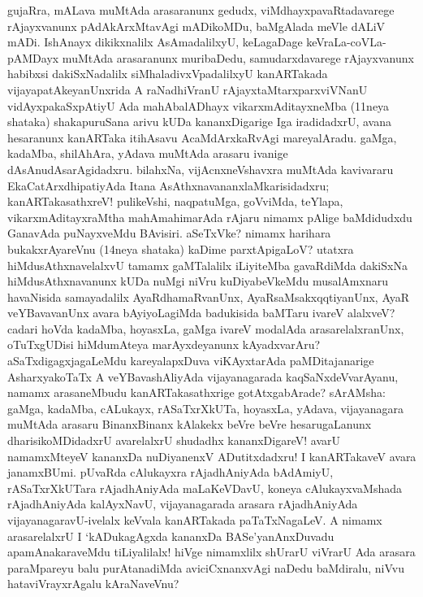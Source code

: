 \documentclass[11pt,a4size]{article}
\begin{document}
gujaRra, mALava muMtAda arasaranunx gedudx, viMdhayxpavaRtadavarege
rAjayxvanunx pAdAkArxMtavAgi mADikoMDu, baMgAlada meVle dALiV
mADi. IshAnayx dikikxnalilx AsAmadalilxyU, keLagaDage
keVraLa-coVLa-pAMDayx muMtAda arasaranunx muribaDedu, samudarxdavarege 
rAjayxvanunx habibxsi dakiSxNadalilx siMhaladivxVpadalilxyU
kanARTakada vijayapatAkeyanUnxrida A raNadhiVranU
rAjayxtaMtarxparxviVNanU vidAyxpakaSxpAtiyU Ada mahAbalADhayx
vikarxmAditayxneMba (11neya shataka) shakapuruSana arivu kUDa
kananxDigarige Iga iradidadxrU, avana hesaranunx kanARTaka itihAsavu
AcaMdArxkaRvAgi mareyalAradu. gaMga, kadaMba, shilAhAra, yAdava
muMtAda arasaru ivanige dAsAnudAsarAgidadxru. bilahxNa,
vijAcnxneVshavxra muMtAda kavivararu EkaCatArxdhipatiyAda Itana
AsAthxnavananxlaMkarisidadxru; kanARTakasathxreV! pulikeVshi,
naqpatuMga, goVviMda, teYlapa, vikarxmAditayxraMtha mahAmahimarAda
rAjaru nimamx pAlige baMdidudxdu GanavAda puNayxveMdu
BAvisiri. aSeTxVke? nimamx harihara bukakxrAyareVnu (14neya shataka)
kaDime parxtApigaLoV? utatxra hiMdusAthxnavelalxvU tamamx gaMTalalilx
iLiyiteMba gavaRdiMda dakiSxNa hiMdusAthxnavanunx kUDa nuMgi niVru
kuDiyabeVkeMdu musalAmxnaru havaNisida samayadalilx AyaRdhamaRvanUnx,
AyaRsaMsakxqqtiyanUnx, AyaR veYBavavanUnx avara bAyiyoLagiMda
badukisida baMTaru ivareV alalxveV? cadari hoVda kadaMba, hoyasxLa,
gaMga ivareV modalAda arasarelalxranUnx, oTuTxgUDisi hiMdumAteya
marAyxdeyanunx kAyadxvarAru? aSaTxdigagxjagaLeMdu kareyalapxDuva
viKAyxtarAda paMDitajanarige AsharxyakoTaTx A veYBavashAliyAda
vijayanagarada kaqSaNxdeVvarAyanu, namamx arasaneMbudu
kanARTakasathxrige gotAtxgabArade? sArAMsha: gaMga, kadaMba, cALukayx,
rASaTxrXkUTa, hoyasxLa, yAdava, vijayanagara muMtAda arasaru
BinanxBinanx kAlakekx beVre beVre hesarugaLanunx dharisikoMDidadxrU
avarelalxrU shudadhx kananxDigareV! avarU namamxMteyeV kananxDa
nuDiyanenxV ADutitxdadxru! I kanARTakaveV avara janamxBUmi. pUvaRda
cAlukayxra rAjadhAniyAda bAdAmiyU, rASaTxrXkUTara rAjadhAniyAda
maLaKeVDavU, koneya cAlukayxvaMshada rAjadhAniyAda kalAyxNavU,
vijayanagarada arasara rAjadhAniyAda vijayanagaravU-ivelalx keVvala
kanARTakada paTaTxNagaLeV. A nimamx arasarelalxrU I `kADukagAgxda
kananxDa BASe'yanAnxDuvadu apamAnakaraveMdu tiLiyalilalx! hiVge
nimamxlilx shUrarU viVrarU Ada arasara paraMpareyu balu purAtanadiMda
aviciCxnanxvAgi naDedu baMdiralu, niVvu hataviVrayxrAgalu kAraNaveVnu?
\end{document}
